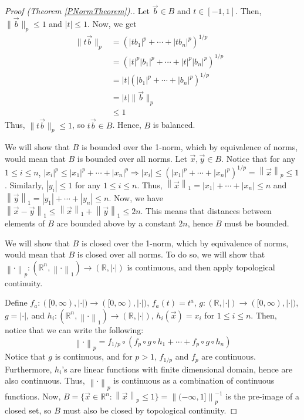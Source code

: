 \documentclass{article}
\renewcommand{\implies}{\Rightarrow}
\newcommand{\R}{\mathbb{R}}
\newcommand{\norm}[1]{\left\|#1\right\|}
\theoremstyle{plain} %
\numberwithin{thm}{section} %
\theoremstyle{definition} %
\begin{document}
\begin{proof}[Proof (Theorem \ref{PNormTheorem}).]
 Let $\vec{b} \in B$ and $t \in [-1, 1]$. Then, $\|\vec{b}\|_p \leq 1$ and $|t| \leq 1$. Now, we get
\begin{align*}
    \|t\vec{b}\|_p
    &= (|tb_1|^p + \cdots + |tb_n|^p)^{1/p} &\\
    &= (|t|^p|b_1|^p + \cdots + |t|^p|b_n|^p)^{1/p} &\\
    &= |t|(|b_1|^p + \cdots + |b_n|^p)^{1/p} &\\
    &= |t|\|\vec{b}\|_p &\\
    &\leq 1
\end{align*}
Thus, $\|t\vec{b}\|_p \leq 1$, so $t\vec{b} \in B$. Hence, $B$ is balanced.

 We will show that $B$ is bounded over the 1-norm, which by equivalence of norms, would mean that $B$ is bounded over all norms. Let $\vec{x}, \vec{y} \in B$. Notice that for any $1 \leq i \leq n$, $|x_i|^p \leq |x_1|^p + \cdots + |x_n|^p \implies |x_i| \leq (|x_1|^p + \cdots + |x_n|^p)^{1/p} = \norm{\vec{x}}_p \leq 1$. Similarly, $|y_i| \leq 1$ for any $1 \leq i \leq n$. Thus, $\norm{\vec{x}}_1 = |x_1| + \cdots + |x_n| \leq n$ and $\norm{\vec{y}}_1 = |y_1| + \cdots + |y_n| \leq n$. Now, we have $\norm{\vec{x} - \vec{y}}_1 \leq \norm{\vec{x}}_1 + \norm{\vec{y}}_1 \leq 2n$. This means that distances between elements of $B$ are bounded above by a constant $2n$, hence $B$ must be bounded.

 We will show that $B$ is closed over the 1-norm, which by equivalence of norms, would mean that $B$ is closed over all norms. To do so, we will show that $\norm{\cdot}_p: (\R^n, \norm{\cdot}_1) \to (\R, |\cdot|)$ is continuous, and then apply topological continuity.

Define $f_a: ([0, \infty), |\cdot|) \to ([0, \infty), |\cdot|)$, $f_a(t) = t^a$, $g: (\R, |\cdot|) \to ([0, \infty), |\cdot|)$, $g = |\cdot|$, and $h_i: (\R^n, \norm{\cdot}_1) \to (\R, |\cdot|)$, $h_i(\vec{x}) = x_i$ for $1 \leq i \leq n$. Then, notice that we can write the following:
\[
    \norm{\cdot}_p = f_{1/p} \circ (f_p \circ g \circ h_1 + \cdots + f_p \circ g \circ h_n)
\]
Notice that $g$ is continuous, and for $p > 1$, $f_{1/p}$ and $f_p$ are continuous. Furthermore, $h_i$'s are linear functions with finite dimensional domain, hence are also continuous. Thus, $\norm{\cdot}_p$ is continuous as a combination of continuous functions. Now, $B = \{\vec{x} \in \R^n: \norm{\vec{x}}_p \leq 1\} = \norm{(-\infty, 1]}_p^{-1}$ is the pre-image of a closed set, so $B$ must also be closed by topological continuity.


\end{proof}
\end{document}
